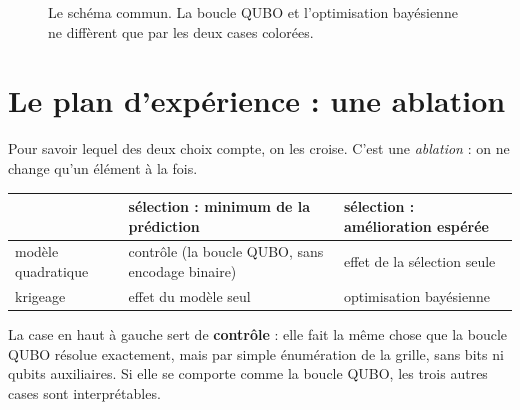 \begin{figure}[htbp]
\centering
{}
\caption{Le schéma commun. La boucle QUBO et l'optimisation bayésienne ne diffèrent que par les deux cases colorées.}\label{fig:schema}
\end{figure}

\section{Le plan d'expérience : une ablation}
Pour savoir lequel des deux choix compte, on les croise. C'est une \emph{ablation} : on ne change qu'un élément à la fois.

\begin{center}
\renewcommand{\arraystretch}{1.25}
\begin{tabularx}{\linewidth}{l>{\centering\arraybackslash}X>{\centering\arraybackslash}X}
\toprule
 & sélection : minimum de la prédiction & sélection : amélioration espérée \\
\midrule
modèle quadratique & contrôle (la boucle QUBO, sans encodage binaire) & effet de la sélection seule \\
krigeage & effet du modèle seul & optimisation bayésienne \\
\bottomrule
\end{tabularx}
\end{center}

La case en haut à gauche sert de \textbf{contrôle} : elle fait la même chose que la boucle QUBO résolue exactement, mais par simple énumération de la grille, sans bits ni qubits auxiliaires. Si elle se comporte comme la boucle QUBO, les trois autres cases sont interprétables.

